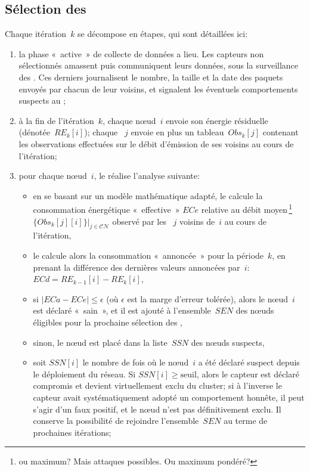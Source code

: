     \subsection{Sélection des \cns}

Chaque itération~$k$ se décompose en étapes, qui sont détaillées ici:
\begin{enumerate}
    \item la phase « active » de collecte de données a lieu. Les capteurs non sélectionnés amassent puis communiquent leurs données, sous la surveillance des \cns. Ces derniers journalisent le nombre, la taille et la date des paquets envoyés par chacun de leur voisins, et signalent les éventuels comportements suspects au \ch;
    \item à la fin de l'itération~$k$, chaque nœud~$i$ envoie son énergie résiduelle (dénotée~$RE_k[i]$); chaque \cn~$j$ envoie en plus un tableau~$Obs_k[j]$ contenant les observations effectuées sur le débit d'émission de ses voisins au cours de l'itération;
    \item pour chaque nœud~$i$, le \ch réalise l'analyse suivante:
        \begin{itemize}
            \item en se basant sur un modèle mathématique adapté, le \CH calcule la consommation énergétique « effective » $ECe$ relative au débit moyen\,\footnote{ou maximum? Mais attaques possibles. Ou maximum pondéré?} $\{Obs_k[j][i]\}|_{j\in \mathcal{CN}}$ observé par les \cns~$j$ voisins de~$i$ au cours de l'itération,
            \item le \CH calcule alors la consommation « annoncée » pour la période~$k$, en prenant la différence des dernières valeurs annoncées par~$i$: $ECd=RE_{k-1}[i] - RE_k[i]$,
            \item si $|ECa-ECe|\leq\epsilon$ (où $\epsilon$ est la marge d'erreur tolérée), alors le nœud~$i$ est déclaré « sain », et il est ajouté à l'ensemble~$SEN$ des nœuds éligibles pour la prochaine sélection des \cns,
            \item sinon, le nœud est placé dans la liste~$SSN$ des nœuds suspects,
            \item soit $SSN[i]$ le nombre de fois où le nœud~$i$ a été déclaré suspect depuis le déploiement du réseau. Si $SSN[i] \ge \mathrm{seuil}$, alors le capteur est déclaré compromis et devient virtuellement exclu du cluster; si à l'inverse le capteur avait systématiquement adopté un comportement honnête, il peut s'agir d'un faux positif, et le nœud n'est pas définitivement exclu. Il conserve la possibilité de rejoindre l'ensemble~$SEN$ au terme de prochaines itérations;

\end{itemize}
\end{enumerate}
